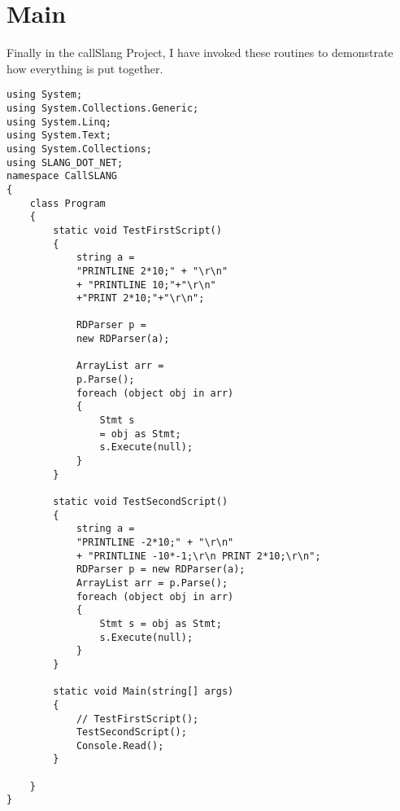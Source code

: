 \section{Main}
Finally in the callSlang Project, I have invoked these routines to demonstrate how everything is put together.
\lstset{style=csharp}
\begin{lstlisting}
using System;
using System.Collections.Generic;
using System.Linq;
using System.Text;
using System.Collections;
using SLANG_DOT_NET;
namespace CallSLANG
{
	class Program
	{
		static void TestFirstScript()
		{
			string a = 
			"PRINTLINE 2*10;" + "\r\n" 
			+ "PRINTLINE 10;"+"\r\n" 
			+"PRINT 2*10;"+"\r\n";

			RDParser p = 
			new RDParser(a);

			ArrayList arr = 
			p.Parse();
			foreach (object obj in arr)
			{
				Stmt s 
				= obj as Stmt;
				s.Execute(null);
			}
		}
		
		static void TestSecondScript()
		{
			string a = 
			"PRINTLINE -2*10;" + "\r\n" 
			+ "PRINTLINE -10*-1;\r\n PRINT 2*10;\r\n";
			RDParser p = new RDParser(a);
			ArrayList arr = p.Parse();
			foreach (object obj in arr)
			{
				Stmt s = obj as Stmt;
				s.Execute(null);
			}
		}
		
		static void Main(string[] args)
		{
			// TestFirstScript();
			TestSecondScript();
			Console.Read();
		}

	} 
}
\end{lstlisting}